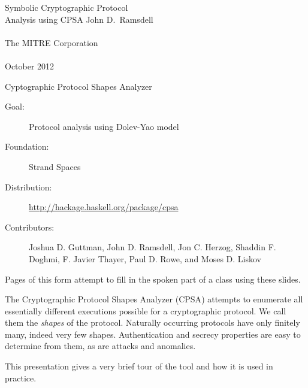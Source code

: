 \documentclass[landscape]{slides}
\newcommand{\cpsa}{CPSA}
\begin{document}
\begin{titleslide}{Symbolic Cryptographic Protocol \\ Analysis using CPSA}
%
John D.~Ramsdell\\
~\\
The MITRE Corporation\\
~\\
October 2012
\end{titleslide}

\begin{mitreslide}{Cyptographic Protocol Shapes Analyzer}
\begin{description}
\item [Goal:] Protocol analysis using Dolev-Yao model
\item [Foundation:] Strand Spaces
\item [Distribution:] \url{http://hackage.haskell.org/package/cpsa}
\item [Contributors:]
  Joshua D. Guttman, John D. Ramsdell, Jon C. Herzog, Shaddin
  F. Doghmi, F. Javier Thayer, Paul D. Rowe, and Moses D. Liskov
\end{description}
\end{mitreslide}

\begin{note}
  Pages of this form attempt to fill in the spoken part of a
  class using these slides.

  The Cryptographic Protocol Shapes Analyzer ({\cpsa}) attempts to
  enumerate all essentially different executions possible for a
  cryptographic protocol. We call them the \emph{shapes} of the
  protocol. Naturally occurring protocols have only finitely many,
  indeed very few shapes. Authentication and secrecy properties are
  easy to determine from them, as are attacks and anomalies.

  This presentation gives a very brief tour of the tool and how it is
  used in practice.
\end{note}
\end{document}
